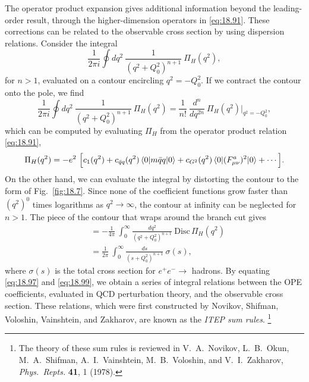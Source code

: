 The operator product expansion gives additional information beyond the
leading-order result, through the higher-dimension operators in
\eqref{eq:18.91}.  These corrections can be related to the observable cross
section by using dispersion relations.  Consider the integral
\begin{equation}
  \frac{1}{2\pi i}\oint dq^2\ \frac{1}{(q^2+Q_0^2)^{n+1}}\ \Pi_H(q^2) ,
  \label{eq:18.97}
\end{equation}
for $n > 1$, evaluated on a contour encircling $q^2 = -Q_0^2$.  If we
contract the contour onto the pole, we find
\begin{equation}
  \frac{1}{2\pi i}\oint dq^2\ \frac{1}{(q^2+Q_0^2)^{n+1}}\ \Pi_H(q^2)
  = \frac{1}{n!}\ \frac{d^n}{dq^{2n}}\ \Pi_H(q^2)\Big|_{q^2=-Q_0^2} ,
\end{equation}
which can be computed by evaluating $\Pi_H$ from the operator product
relation \eqref{eq:18.91},
\begin{equation}
  \Pi_H(q^2) = -e^2\ \Bigl[ c_1(q^2) + c_{\bar{q}q}(q^2)\,
    \langle 0|m\bar{q}q|0\rangle + c_{G^2}(q^2)\,
      \langle 0|(F^a_{\mu\nu})^2|0\rangle + \cdots \Bigr] .
  \label{eq:18.98}
\end{equation}
On the other hand, we can evaluate the integral by distorting the contour to
the form of Fig.~\ref{fig:18.7}.  Since none of the coefficient functions grow
faster than $(q^2)^0$ times logarithms as $q^2\to\infty$, the contour at
infinity can be neglected for $n > 1$.  The piece of the contour that wraps
around the branch cut gives
\begin{equation}
  \begin{aligned}
    &= -\frac{1}{4\pi}\ \int_0^{\infty} \frac{dq^2}{(q^2+Q_0^2)^{n+1}}\
      \mathrm{Disc}\,\Pi_H(q^2)\\
    &= \frac{1}{2\pi}\ \int_0^{\infty} \frac{ds}{(s+Q_0^2)^{n+1}}\
      \sigma(s) ,
  \end{aligned}
  \label{eq:18.99}
\end{equation}
where $\sigma(s)$ is the total cross section for $e^{+}e^{-}\to$ hadrons.
By equating \eqref{eq:18.97} and \eqref{eq:18.99}, we obtain a series of
integral relations between the OPE coefficients, evaluated in QCD perturbation
theory, and the observable cross section.  These relations, which were first
constructed by Novikov, Shifman, Voloshin, Vainshtein, and Zakharov, are
known as the \emph{ITEP sum rules}.%
\footnote{The theory of these sum rules is reviewed in V.~A.~Novikov,
L.~B.~Okun, M.~A.~Shifman, A.~I.~Vainshtein, M.~B.~Voloshin, and
V.~I.~Zakharov, \emph{Phys.\ Repts.} \textbf{41}, 1 (1978).}

